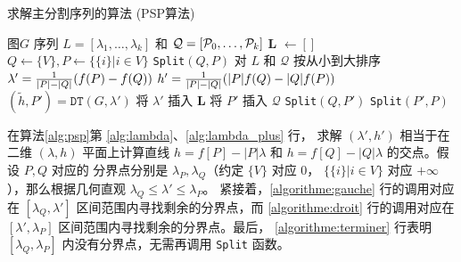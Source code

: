 \begin{algorithm}
  \caption{求解主分割序列的算法 (PSP算法)}
  \label{alg:psp}
  \small
  \begin{algorithmic}[1]
    \REQUIRE 图$G$
    \ENSURE 序列 $L=[\lambda_1, \dots, \lambda_k]$
    和 $\mathcal{Q}=[\P_0, \dots, \P_k]$
    \STATE \textbf{L}  $\leftarrow []$
    \STATE $Q\leftarrow \{V\}, P \leftarrow \{ \{i \} | i \in V\}$
    \STATE \texttt{Split}$(Q,P)$
    \STATE 对 $L$ 和 $\mathcal{Q}$
    按从小到大排序 \footnotemark
     \STATE\label{alg:lambda} $\lambda' =
     {1 \over \abs{P} - \abs{Q}} (f(P)-f(Q))$
     \STATE\label{alg:lambda_plus} $h' = {1 \over \abs{P} - \abs{Q}}(\abs{P} f(Q) - \abs{Q} f(P))$
     \STATE\label{alg:lambda_f} $(\tilde{h}, P') = \texttt{DT}(G,\lambda')$
       \STATE\label{algorithme:terminer} 将 $\lambda'$ 插入 $\mathbf{L}$
     \ELSE
       \STATE 将 $P'$ 插入 $\mathcal{Q}$
       \STATE\label{algorithme:gauche} \texttt{Split}$(Q, P')$
       \STATE\label{algorithme:droit} \texttt{Split}$(P',P)$
     \ENDIF
    \ENDFUNCTION
  \end{algorithmic}
\end{algorithm}

在算法\ref{alg:psp}第 \ref{alg:lambda}、\ref{alg:lambda_plus} 行，
求解 $(\lambda', h')$ 相当于在二维 $(\lambda, h)$
平面上计算直线
$h = f[P] - |P| \lambda $
和 $h = f[Q] - |Q| \lambda $ 的交点。假设 $P, Q$ 对应的
分界点分别是 $\lambda_P, \lambda_Q$（约定 $\{V\}$ 对应 0，
$\{\{i\}|i\in V\}$ 对应 $+\infty$），那么根据几何直观
$\lambda_Q \leq \lambda' \leq \lambda_P$。
紧接着，\ref{algorithme:gauche} 行的调用对应在
$[\lambda_Q, \lambda']$
区间范围内寻找剩余的分界点，而
\ref{algorithme:droit} 行的调用对应在
$[\lambda', \lambda_P]$
区间范围内寻找剩余的分界点。最后，
\ref{algorithme:terminer} 行表明
$[\lambda_Q, \lambda_P]$ 内没有分界点，无需再调用
\texttt{Split} 函数。

